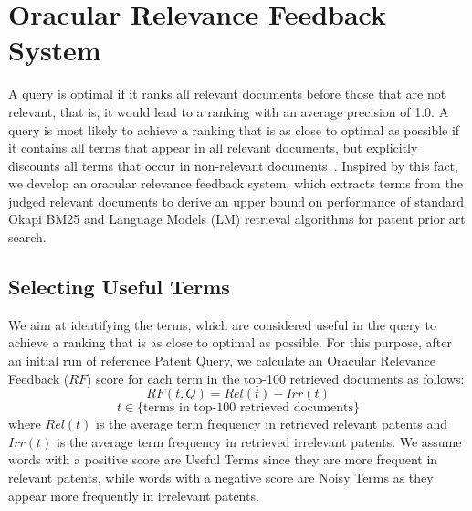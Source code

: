 \section{Oracular Relevance Feedback System}
\label{sec:oraculrquery}
A query is optimal if it ranks all relevant documents before
those that are not relevant, that is, it would lead to a ranking with an average precision of 1.0. A query
is most likely to achieve a ranking that is as close to optimal as possible if it contains all terms that
appear in all relevant documents, but explicitly discounts all terms that occur in non-relevant documents~\citep{manning2008introduction}.
Inspired by this fact, we develop an oracular relevance feedback system, which
extracts terms from the judged relevant documents to derive an upper bound on performance of
standard Okapi BM25 and Language Models (LM) retrieval
algorithms for patent prior art search.
\subsection{Selecting Useful Terms}
\label{OracularTermSelection}
We aim at identifying the terms, which are considered useful in the query to achieve a ranking that is as close to optimal as possible. For this purpose, 
after an initial run of reference Patent Query, we
calculate an Oracular Relevance Feedback ($\mathit{RF}$) score for each term in the top-100
retrieved documents as follows:
\begin{equation}
RF(t,Q)=Rel(t)-Irr(t) 
 \label{eq:score}
\end{equation}
\begin{displaymath}t\in \lbrace \mbox{terms in top-100 retrieved documents}\rbrace\end{displaymath}
where $ \mathit{Rel(t)} $ is the average term frequency in retrieved relevant patents and $ \mathit{Irr(t)} $ is the average term frequency in retrieved irrelevant patents. We assume words with a positive score are Useful Terms since they are more frequent in relevant patents, while words with a negative score are Noisy Terms as they appear more frequently in irrelevant patents. 

